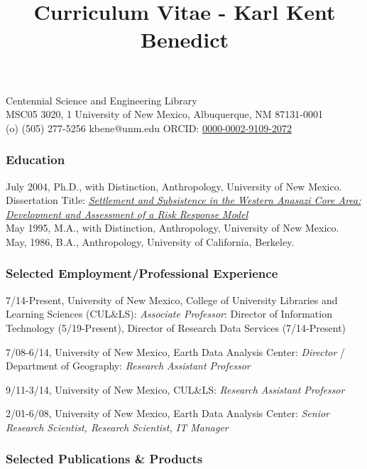 \documentclass[]{article}
\title{Curriculum Vitae - Karl Kent Benedict}
\begin{document}
\thetitle %

Centennial Science and Engineering Library\\
MSC05 3020, 1 University of New Mexico, Albuquerque, NM 87131-0001\\
(o) (505) 277-5256 \textbar{} kbene@unm.edu \textbar{} ORCID:
\href{https://orcid.org/0000-0002-9109-2072}{0000-0002-9109-2072}

\hypertarget{education}{%
\subsubsection{Education}\label{education}}

July 2004, Ph.D., with Distinction, Anthropology, University of New
Mexico. Dissertation Title:
\href{http://karlbenedict.com/documents/dissmaster-refs_comp.pdf}{\emph{Settlement
and Subsistence in the Western Anasazi Core Area: Development and
Assessment of a Risk Response Model}}\\
May 1995, M.A., with Distinction, Anthropology, University of New
Mexico.\\
May, 1986, B.A., Anthropology, University of California, Berkeley.

\hypertarget{selected-employmentprofessional-experience}{%
\subsubsection{Selected Employment/Professional
Experience}\label{selected-employmentprofessional-experience}}

7/14-Present, University of New Mexico, College of University Libraries
and Learning Sciences (CUL\&LS): \emph{Associate Professor}: Director of
Information Technology (5/19-Present), Director of Research Data
Services (7/14-Present)

7/08-6/14, University of New Mexico, Earth Data Analysis Center:
\emph{Director} / Department of Geography: \emph{Research Assistant
Professor}

9/11-3/14, University of New Mexico, CUL\&LS: \emph{Research Assistant
Professor}

2/01-6/08, University of New Mexico, Earth Data Analysis Center:
\emph{Senior Research Scientist, Research Scientist, IT Manager}

\hypertarget{selected-publications-products}{%
\subsubsection{Selected Publications \&
Products}\label{selected-publications-products}}
\end{document}
